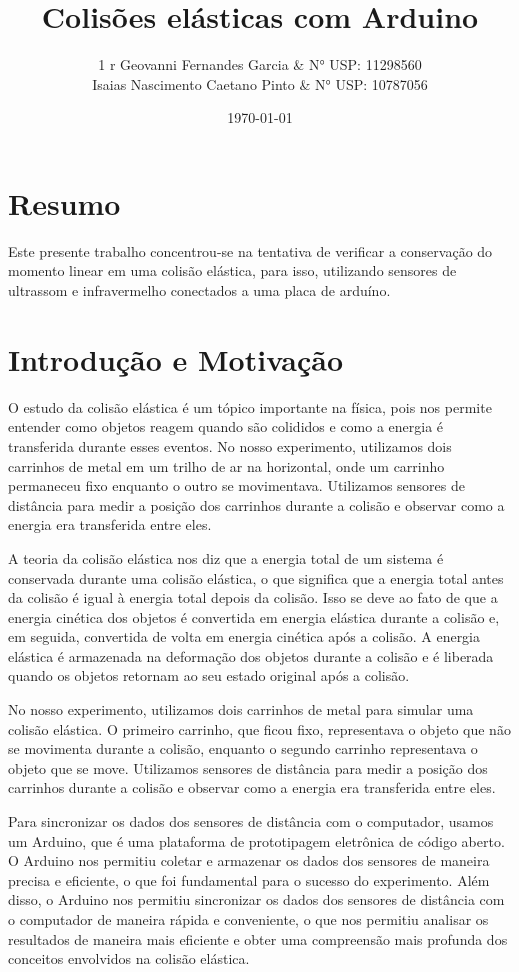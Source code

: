 \documentclass[a4paper,12pt]{article}
\title{Colisões elásticas com Arduino}
\author{\begin{tabular}{1 r}
        Geovanni Fernandes Garcia & N° USP: 11298560\\
        Isaias Nascimento Caetano Pinto & N° USP:  10787056
	    \end{tabular}}
\date{\today}
\begin{document}
\maketitle

\begin{multicols}{2}

\section{Resumo}
Este presente trabalho concentrou-se na tentativa de verificar a conservação do momento linear em uma colisão elástica, para isso, utilizando sensores de ultrassom e infravermelho conectados a uma placa de arduíno. 

\section{Introdução e Motivação}

O estudo da colisão elástica é um tópico importante na física, pois nos permite entender como objetos reagem quando são colididos e como a energia é transferida durante esses eventos. No nosso experimento, utilizamos dois carrinhos de metal em um trilho de ar na horizontal, onde um carrinho permaneceu fixo enquanto o outro se movimentava. Utilizamos sensores de distância para medir a posição dos carrinhos durante a colisão e observar como a energia era transferida entre eles.

A teoria da colisão elástica nos diz que a energia total de um sistema é conservada durante uma colisão elástica, o que significa que a energia total antes da colisão é igual à energia total depois da colisão. Isso se deve ao fato de que a energia cinética dos objetos é convertida em energia elástica durante a colisão e, em seguida, convertida de volta em energia cinética após a colisão. A energia elástica é armazenada na deformação dos objetos durante a colisão e é liberada quando os objetos retornam ao seu estado original após a colisão.

No nosso experimento, utilizamos dois carrinhos de metal para simular uma colisão elástica. O primeiro carrinho, que ficou fixo, representava o objeto que não se movimenta durante a colisão, enquanto o segundo carrinho representava o objeto que se move. Utilizamos sensores de distância para medir a posição dos carrinhos durante a colisão e observar como a energia era transferida entre eles.

Para sincronizar os dados dos sensores de distância com o computador, usamos um Arduino, que é uma plataforma de prototipagem eletrônica de código aberto. O Arduino nos permitiu coletar e armazenar os dados dos sensores de maneira precisa e eficiente, o que foi fundamental para o sucesso do experimento. Além disso, o Arduino nos permitiu sincronizar os dados dos sensores de distância com o computador de maneira rápida e conveniente, o que nos permitiu analisar os resultados de maneira mais eficiente e obter uma compreensão mais profunda dos conceitos envolvidos na colisão elástica.


\end{multicols}
\end{document}
